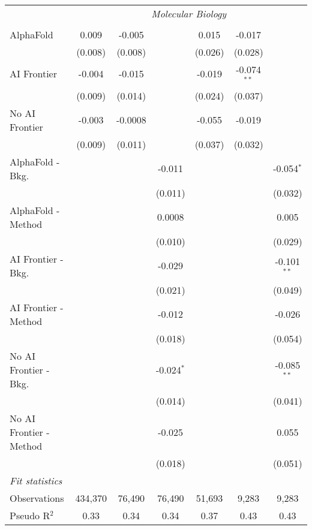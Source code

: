 \begin{tabular}{lcccccc}
 & \multicolumn{6}{c}{\textit{Molecular Biology}} \\ \\
   AlphaFold               & 0.009   & -0.005  &              & 0.015   & -0.017        &   \\   
                           & (0.008) & (0.008) &              & (0.026) & (0.028)       &   \\   
   AI Frontier             & -0.004  & -0.015  &              & -0.019  & -0.074$^{**}$ &   \\   
                           & (0.009) & (0.014) &              & (0.024) & (0.037)       &   \\   
   No AI Frontier          & -0.003  & -0.0008 &              & -0.055  & -0.019        &   \\   
                           & (0.009) & (0.011) &              & (0.037) & (0.032)       &   \\   
   AlphaFold - Bkg.        &         &         & -0.011       &         &               & -0.054$^{*}$\\   
                           &         &         & (0.011)      &         &               & (0.032)\\   
   AlphaFold - Method      &         &         & 0.0008       &         &               & 0.005\\   
                           &         &         & (0.010)      &         &               & (0.029)\\   
   AI Frontier - Bkg.      &         &         & -0.029       &         &               & -0.101$^{**}$\\   
                           &         &         & (0.021)      &         &               & (0.049)\\   
   AI Frontier - Method    &         &         & -0.012       &         &               & -0.026\\   
                           &         &         & (0.018)      &         &               & (0.054)\\   
   No AI Frontier - Bkg.   &         &         & -0.024$^{*}$ &         &               & -0.085$^{**}$\\   
                           &         &         & (0.014)      &         &               & (0.041)\\   
   No AI Frontier - Method &         &         & -0.025       &         &               & 0.055\\   
                           &         &         & (0.018)      &         &               & (0.051)\\   
   \midrule
   \emph{Fit statistics}\\
   Observations            & 434,370 & 76,490  & 76,490       & 51,693  & 9,283         & 9,283\\  
   Pseudo R$^2$            & 0.33    & 0.34    & 0.34         & 0.37    & 0.43          & 0.43\\  
   

\end{tabular}
